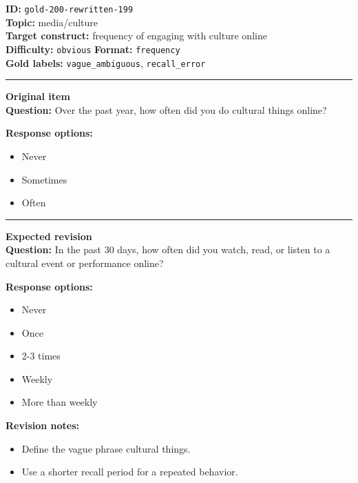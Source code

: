 \documentclass[10pt,a4paper]{article}
\newcommand{\sectionline}{\vspace{0.15em}\hrule\vspace{0.35em}}
\begin{document}
\begin{tcolorbox}[colframe=FlawRed,colback=white,colbacktitle=FlawRed!9,coltitle=black,title={Item 199\hfill Flawed item}]
\textbf{ID:} \texttt{gold-200-rewritten-199}\\
\textbf{Topic:} media/culture\\
\textbf{Target construct:} frequency of engaging with culture online\\
\textbf{Difficulty:} \texttt{obvious} \quad \textbf{Format:} \texttt{frequency}\\
\textbf{Gold labels:} \texttt{vague\_ambiguous}, \texttt{recall\_error}\\
\sectionline
\textbf{Original item}\\
\textbf{Question:} Over the past year, how often did you do cultural things online?
\par\textbf{Response options:}
\begin{itemize}
\item Never
\item Sometimes
\item Often
\end{itemize}
\sectionline
\textbf{Expected revision}\\
\textbf{Question:} In the past 30 days, how often did you watch, read, or listen to a cultural event or performance online?
\par\textbf{Response options:}
\begin{itemize}
\item Never
\item Once
\item 2-3 times
\item Weekly
\item More than weekly
\end{itemize}
\par\textbf{Revision notes:}
\begin{itemize}
\item Define the vague phrase cultural things.
\item Use a shorter recall period for a repeated behavior.
\end{itemize}
\end{tcolorbox}
\end{document}
